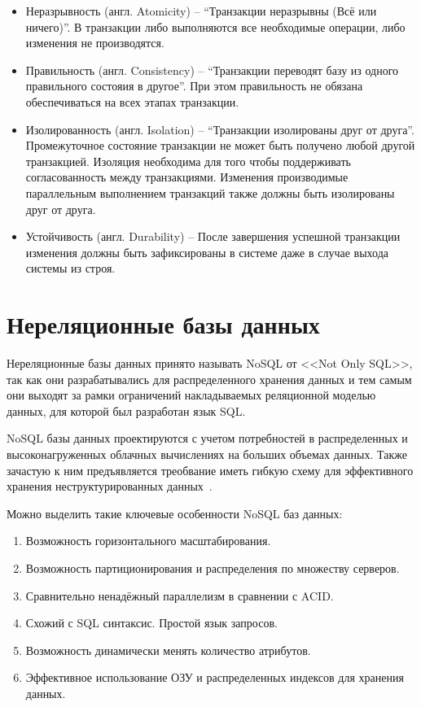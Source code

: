\begin{itemize}[label=---]
    \item Неразрывность (англ. Atomicity) -- ``Транзакции неразрывны (Всё или ничего)''.
    В транзакции либо выполняются все необходимые операции, либо изменения не производятся.

    \item Правильность (англ. Consistency) -- ``Транзакции переводят базу из одного правильного состояия в другое''.
    При этом правильность не обязана обеспечиваться на всех этапах транзакции. 
    
    \item Изолированность (англ. Isolation) -- ``Транзакции изолированы друг от друга''. 
    Промежуточное состояние транзакции не может быть получено любой другой транзакцией.
    Изоляция необходима для того чтобы поддерживать согласованность между транзакциями.
    Изменения производимые параллельным выполнением транзакций также должны быть изолированы друг от друга.

    \item Устойчивость (англ. Durability) -- После завершения успешной транзакции изменения должны быть зафиксированы в системе
    даже в случае выхода системы из строя.

\end{itemize}

\clearpage

\section{Нереляционные базы данных}
Нереляционные базы данных принято называть NoSQL от <<Not Only SQL>>,
так как они разрабатывались для распределенного хранения данных
и тем самым они выходят за рамки ограничений накладываемых реляционной моделью данных,
для которой был разработан язык SQL.

NoSQL базы данных проектируются с учетом потребностей в распределенных
и высоконагруженных облачных вычислениях на больших объемах данных.
Также зачастую к ним предъявляется треобвание иметь гибкую схему 
для эффективного хранения неструктурированных данных~\cite{nosqlusage}.  

Можно выделить такие ключевые особенности NoSQL баз данных:
\begin{enumerate}
    \item Возможность горизонтального масштабирования.
    \item Возможность партиционирования и распределения по множеству серверов.
    \item Сравнительно ненадёжный параллелизм в сравнении с ACID.
    \item Схожий с SQL синтаксис. Простой язык запросов.
    \item Возможность динамически менять количество атрибутов.
    \item Эффективное использование ОЗУ и распределенных индексов для хранения данных.
\end{enumerate}

